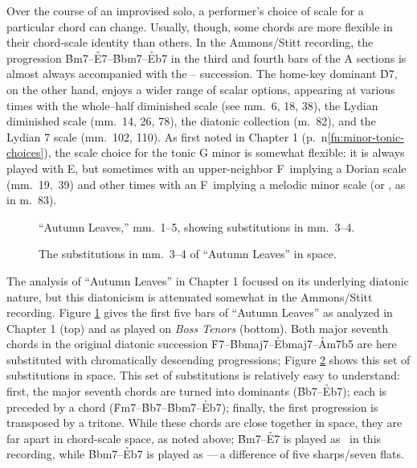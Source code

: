 Over the course of an improvised solo, a performer's choice of scale for a
particular chord can change. Usually, though, some chords are more flexible in
their chord-scale identity than others. In the Ammons/Stitt
recording, the progression \h{Bm7}--\h{E7}--\h{Bbm7}--\h{Eb7} in the third and
fourth bars of the A sections is almost always accompanied with the
-- succession. The
home-key dominant \h{D7}, on the other hand, enjoys a wider range of scalar
options, appearing at various times with the whole--half diminished scale (see
mm.~6, 18, 38), the Lydian diminished scale (mm.~14, 26, 78), the diatonic
collection (m.~82), and the Lydian \flat{}7 scale (mm.~102, 110). As first
noted in Chapter 1
(p.~\pageref{fn:minor-tonic-choices}n\ref{fn:minor-tonic-choices}), the scale
choice for the tonic G minor is somewhat flexible: it is always played with
E\nat, but sometimes with an upper-neighbor F\nat\ implying a Dorian scale
(mm.~19,~39) and other times with an F\sharp\ implying a melodic minor scale
(or , as in m.~83).

\begin{figure}[tbp]
  \caption{``Autumn Leaves,'' mm.~1--5, showing substitutions in mm.~3--4.}
  \label{csa:al-subs}
\end{figure}

\begin{figure}[tbp]
  \caption{The substitutions in mm.~3--4 of ``Autumn Leaves'' in \tf space.}
  \label{csa:al-subs-space}
\end{figure}

The analysis of ``Autumn Leaves'' in Chapter 1 focused on its underlying
diatonic nature, but this diatonicism is attenuated somewhat in the
Ammons/Stitt recording. Figure \ref{csa:al-subs} gives the first five bars of
``Autumn Leaves'' as analyzed in Chapter 1 (top) and as played on \emph{Boss
  Tenors} (bottom). Both major seventh chords in the original diatonic
succession \h{F7}--\h{Bbmaj7}--\h{Ebmaj7}--\h{Am7b5} are here substituted with
chromatically descending \tf progressions; Figure \ref{csa:al-subs-space}
shows this set of substitutions in \tf space. This set of substitutions is
relatively easy to understand: first, the major seventh chords are turned into
dominants (\h{Bb7}--\h{Eb7}); each is preceded by a \ii chord
(\h{Fm7}--\h{Bb7}--\h{Bbm7}--\h{Eb7}); finally, the first \tf progression is
transposed by a tritone. While these chords are close together in \tf space,
they are far apart in chord-scale space, as noted above; \h{Bm7}--\h{E7}
is played as \ in this recording, while
\h{Bbm7}--\h{Eb7} is played as ---\,a difference of
five sharps/seven flats.

